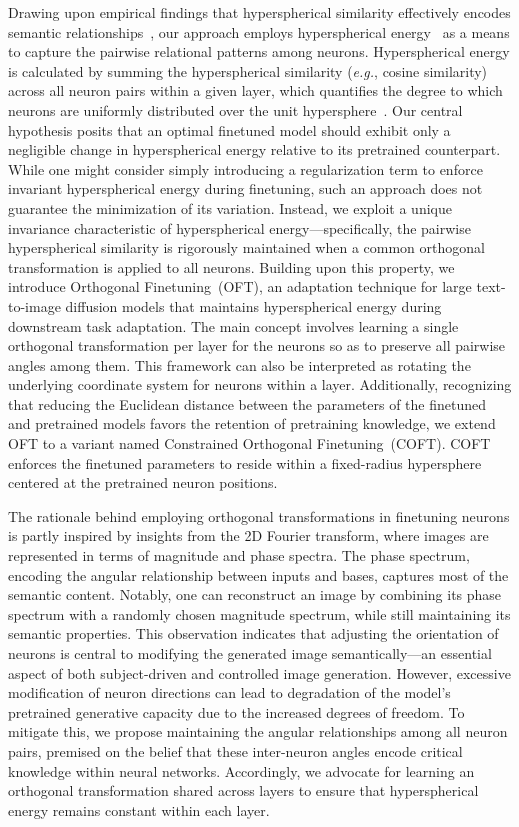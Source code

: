 Drawing upon empirical findings that hyperspherical similarity effectively encodes semantic relationships~\cite{liu2017deep,liu2018decoupled,chen2020angular}, our approach employs hyperspherical energy~\cite{liu2018learning} as a means to capture the pairwise relational patterns among neurons. Hyperspherical energy is calculated by summing the hyperspherical similarity (\emph{e.g.}, cosine similarity) across all neuron pairs within a given layer, which quantifies the degree to which neurons are uniformly distributed over the unit hypersphere~\cite{liu2021learning}. Our central hypothesis posits that an optimal finetuned model should exhibit only a negligible change in hyperspherical energy relative to its pretrained counterpart. While one might consider simply introducing a regularization term to enforce invariant hyperspherical energy during finetuning, such an approach does not guarantee the minimization of its variation. Instead, we exploit a unique invariance characteristic of hyperspherical energy—specifically, the pairwise hyperspherical similarity is rigorously maintained when a common orthogonal transformation is applied to all neurons. Building upon this property, we introduce Orthogonal Finetuning~(OFT), an adaptation technique for large text-to-image diffusion models that maintains hyperspherical energy during downstream task adaptation. The main concept involves learning a single orthogonal transformation per layer for the neurons so as to preserve all pairwise angles among them. This framework can also be interpreted as rotating the underlying coordinate system for neurons within a layer. Additionally, recognizing that reducing the Euclidean distance between the parameters of the finetuned and pretrained models favors the retention of pretraining knowledge, we extend OFT to a variant named Constrained Orthogonal Finetuning~(COFT). COFT enforces the finetuned parameters to reside within a fixed-radius hypersphere centered at the pretrained neuron positions.

The rationale behind employing orthogonal transformations in finetuning neurons is partly inspired by insights from the 2D Fourier transform, where images are represented in terms of magnitude and phase spectra. The phase spectrum, encoding the angular relationship between inputs and bases, captures most of the semantic content. Notably, one can reconstruct an image by combining its phase spectrum with a randomly chosen magnitude spectrum, while still maintaining its semantic properties. This observation indicates that adjusting the orientation of neurons is central to modifying the generated image semantically—an essential aspect of both subject-driven and controlled image generation. However, excessive modification of neuron directions can lead to degradation of the model's pretrained generative capacity due to the increased degrees of freedom. To mitigate this, we propose maintaining the angular relationships among all neuron pairs, premised on the belief that these inter-neuron angles encode critical knowledge within neural networks. Accordingly, we advocate for learning an orthogonal transformation shared across layers to ensure that hyperspherical energy remains constant within each layer.

